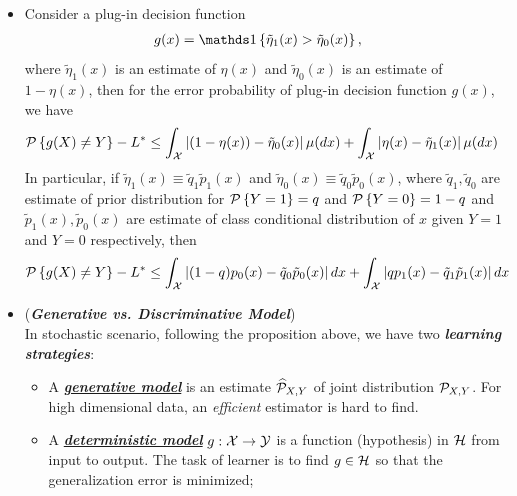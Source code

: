 \documentclass[11pt]{article}
\begin{document}
\begin{itemize}
\item  \begin{corollary}
Consider a plug-in decision function 
\begin{align*}
g(x) &= \ind{\tilde{\eta}_{1}(x)>\tilde{\eta}_{0}(x)},
\end{align*}
where $\tilde{\eta}_{1}(x)$ is an estimate of $\eta(x)$ and $\tilde{\eta}_{0}(x)$ is an estimate of $1-\eta(x)$, then for the error probability of plug-in decision function  $g(x)$, we have
\begin{align}
{\mathcal P}\left\{g(X)\neq Y\right\} - L^{*} &\le \int_{{\mathcal X}}\left\lvert (1- \eta(x))- \tilde{\eta}_{0}(x) \right\rvert\mu(dx)+ \int_{{\mathcal X}}\left\lvert \eta(x)- \tilde{\eta}_{1}(x) \right\rvert\mu(dx)
\end{align}
In particular, if $\tilde{\eta}_{1}(x) \equiv \tilde{q}_{1}\tilde{p}_{1}(x)$ and $\tilde{\eta}_{0}(x)\equiv \tilde{q}_{0}\tilde{p}_{0}(x)$, where $\tilde{q}_{1}, \tilde{q}_{0}$ are estimate of prior distribution for ${\mathcal P}\left\{Y=1\right\}=q$ and ${\mathcal P}\left\{Y=0\right\}=1-q$ and $\tilde{p}_{1}(x), \tilde{p}_{0}(x)$ are estimate of class conditional distribution of $x$ given $Y=1$ and $Y=0$ respectively, then 
\begin{align*}
{\mathcal P}\left\{g(X)\neq Y\right\} - L^{*} &\le \int_{{\mathcal X}}\left\lvert (1- q)p_{0}(x)- \tilde{q}_{0}\tilde{p}_{0}(x) \right\rvert dx+ \int_{{\mathcal X}}\left\lvert qp_{1}(x)- \tilde{q}_{1}\tilde{p}_{1}(x) \right\rvert dx
\end{align*}
\end{corollary}


\item \begin{definition} (\emph{\textbf{Generative vs. Discriminative Model}})\\
In stochastic scenario, following the proposition above, we have two \emph{\textbf{learning strategies}}: 
\begin{itemize}
\item A \underline{\emph{\textbf{generative model}}} is an estimate $\widehat{{\mathcal P}}_{X,Y}$ of joint distribution ${\mathcal P}_{X,Y}$. For high dimensional data, an \emph{efficient} estimator is hard to find.

\item  A \underline{\emph{\textbf{deterministic model}}} $g: {\mathcal X} \rightarrow {\mathcal Y}$ is a function (hypothesis) in ${\mathcal H}$ from input to output. The task of learner is to find $g\in {\mathcal H}$ so that the generalization error is minimized; 


\end{itemize}
\end{definition}
\end{itemize}
\end{document}
